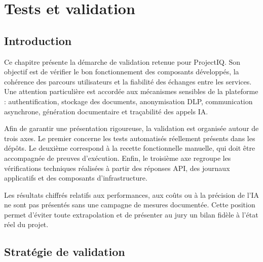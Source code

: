 
\chapter{Tests et validation}
\label{chap:tests-validation}

\section{Introduction}

Ce chapitre présente la démarche de validation retenue pour ProjectIQ. Son objectif est de vérifier le bon fonctionnement des composants développés, la cohérence des parcours utilisateurs et la fiabilité des échanges entre les services. Une attention particulière est accordée aux mécanismes sensibles de la plateforme : authentification, stockage des documents, anonymisation DLP, communication asynchrone, génération documentaire et traçabilité des appels IA.

Afin de garantir une présentation rigoureuse, la validation est organisée autour de trois axes. Le premier concerne les tests automatisés réellement présents dans les dépôts. Le deuxième correspond à la recette fonctionnelle manuelle, qui doit être accompagnée de preuves d'exécution. Enfin, le troisième axe regroupe les vérifications techniques réalisées à partir des réponses API, des journaux applicatifs et des composants d'infrastructure.

Les résultats chiffrés relatifs aux performances, aux coûts ou à la précision de l'IA ne sont pas présentés sans une campagne de mesures documentée. Cette position permet d'éviter toute extrapolation et de présenter au jury un bilan fidèle à l'état réel du projet.

\section{Stratégie de validation}

